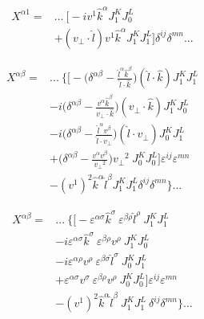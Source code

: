 \begin{equation*}
\begin{split}
 X^{\alpha 1} = &...~ \bigg[  - i v^1 \hat{k}^\alpha J_1^K J_0^L   \\
& + (v_\perp \cdot \hat{l})  v^1 \hat{k}^\alpha J_1^K J_1^L  \bigg] \delta^{ij} \delta^{mn}  ...
\end{split}
\end{equation*}


\begin{equation*}
\begin{split}
 X^{\alpha \beta} = & ...~ \bigg\{ \bigg[ -\Big(\delta^{\alpha \beta}  - \frac{\hat{l}^\alpha \hat{k}^\beta}{\hat{l} \cdot \hat{k}}\Big) (\hat{l} \cdot \hat{k}) J_1^K J_1^L \\
& -i \Big(\delta^{\alpha \beta}  - \frac{v^\alpha \hat{k}^\beta}{v_\perp \cdot \hat{k}}\Big) (v_\perp \cdot \hat{k}) J_1^K J_0^L \\
& -i \Big(\delta^{\alpha \beta}  - \frac{\hat{l}^\alpha v^\beta}{\hat{l} \cdot v_\perp}\Big) (\hat{l} \cdot v_\perp) J_0^K J_1^L \\
& + \Big(\delta^{\alpha \beta}  - \frac{v^\alpha v^\beta}{{v_\perp}^2}\Big) {v_\perp}^2 ~ J_0^K J_0^L \bigg] \varepsilon^{ij} \varepsilon^{mn} \\ 
& -(v^1)^2 \hat{k}^\alpha \hat{l}^\beta J_1^K J_1^L \delta^{ij} \delta^{mn} \bigg\} ...
\end{split}
\end{equation*}

\begin{equation*}
\begin{split}
 X^{\alpha \beta} = & ...~ \bigg\{ \bigg[ - \varepsilon^{\alpha \sigma} \hat{k}^\sigma ~ \varepsilon^{\beta \rho} \hat{l}^\rho ~ J_1^K J_1^L \\
& -i \varepsilon^{\alpha \sigma} \hat{k}^\sigma ~ \varepsilon^{\beta \rho} v^\rho ~ J_1^K J_0^L \\
& -i \varepsilon^{\alpha \rho} v^\rho ~ \varepsilon^{\beta \sigma} \hat{l}^\sigma ~ J_0^K J_1^L \\
& + \varepsilon^{\alpha \sigma} v^\sigma ~ \varepsilon^{\beta \rho} v^\rho ~ J_0^K J_0^L \bigg] \varepsilon^{ij} \varepsilon^{mn} \\ 
& -(v^1)^2 \hat{k}^\alpha \hat{l}^\beta ~  J_1^K J_1^L ~ \delta^{ij} \delta^{mn} \bigg\} ...
\end{split}
\end{equation*}


\newpage

